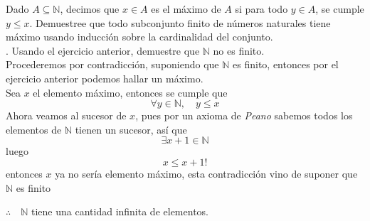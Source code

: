 \documentclass[letterpaper]{article}
\newcommand{\N}{\mathds{N}}
\renewcommand{\*}{\cdot}
\theoremstyle{definition}
\begin{document}
\noindent Dado $ A \subseteq \N $, decimos que $ x \in A $ es el máximo de $ A $ si para todo $ y \in A $, se cumple $ y \leq x $. Demuestree que todo subconjunto finito de números naturales tiene máximo usando inducción sobre la cardinalidad del conjunto.\\



. Usando el ejercicio anterior, demuestre que $ \N $ no es finito.\\

Procederemos por contradicción, suponiendo que $ \N $ es finito, entonces por el ejercicio anterior podemos hallar un máximo. \\
Sea $ x  $ el elemento máximo, entonces se cumple que $$ \forall y \in \N , \quad y \leq x $$ Ahora veamos al sucesor de $ x $, pues por un axioma de \textit{Peano} sabemos todos los elementos de $ \N $ tienen un sucesor, así que $$ \exists x + 1 \in \N $$luego $$ x \leq x+1 !$$ entonces $ x $ ya no sería elemento máximo, esta contradicción vino de suponer que $ \N $ es finito
\begin{center}
	$ \therefore \quad \N$  tiene una cantidad infinita de elementos.
\end{center}
\end{document}
